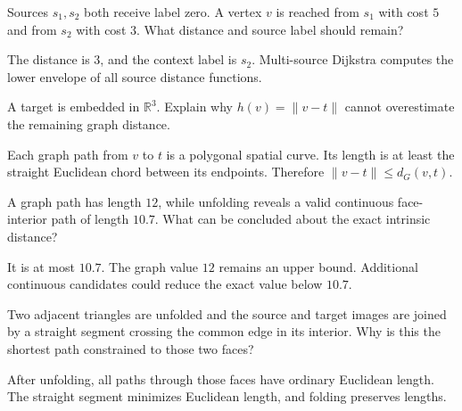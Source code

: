 \begin{problem}\label{prob:vii39-02}
Sources \(s_1,s_2\) both receive label zero.  A vertex \(v\) is reached from \(s_1\) with cost \(5\) and from \(s_2\) with cost \(3\).  What distance and source label should remain?
\end{problem}

\begin{solution}
The distance is \(3\), and the context label is \(s_2\).  Multi-source Dijkstra computes the lower envelope of all source distance functions.
\end{solution}

\begin{problem}\label{prob:vii39-03}
A target is embedded in \(\mathbb R^3\).  Explain why \(h(v)=\|v-t\|\) cannot overestimate the remaining graph distance.
\end{problem}

\begin{solution}
Each graph path from \(v\) to \(t\) is a polygonal spatial curve.  Its length is at least the straight Euclidean chord between its endpoints.  Therefore \(\|v-t\|\le d_G(v,t)\).
\end{solution}

\begin{problem}\label{prob:vii39-04}
A graph path has length \(12\), while unfolding reveals a valid continuous face-interior path of length \(10.7\).  What can be concluded about the exact intrinsic distance?
\end{problem}

\begin{solution}
It is at most \(10.7\).  The graph value \(12\) remains an upper bound.  Additional continuous candidates could reduce the exact value below \(10.7\).
\end{solution}

\begin{problem}\label{prob:vii39-05}
Two adjacent triangles are unfolded and the source and target images are joined by a straight segment crossing the common edge in its interior.  Why is this the shortest path constrained to those two faces?
\end{problem}

\begin{solution}
After unfolding, all paths through those faces have ordinary Euclidean length.  The straight segment minimizes Euclidean length, and folding preserves lengths.
\end{solution}

